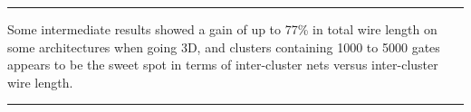 \documentclass[11pt,a4paper]{report} %
\theoremstyle{customdef}
\renewenvironment{abstract}{%
\begin{center}\begin{minipage}{0.85\textwidth}
\rule{\textwidth}{1pt}}
{\par\noindent\rule{\textwidth}{1pt}\end{minipage}\end{center}}
\begin{document}
\begin{titlepage}
\begin{center}
\begin{abstract}
Some intermediate results showed a gain of up to 77\% in total wire length on some architectures when going 3D, and clusters containing 1000 to 5000 gates appears to be the sweet spot in terms of inter-cluster nets versus inter-cluster wire length.




\end{abstract}
 \vfill
\end{center}
\end{titlepage}







\clearpage


\pagestyle{fancy}
\fancyhf{}
\cfoot{\thepage}
\end{document}
